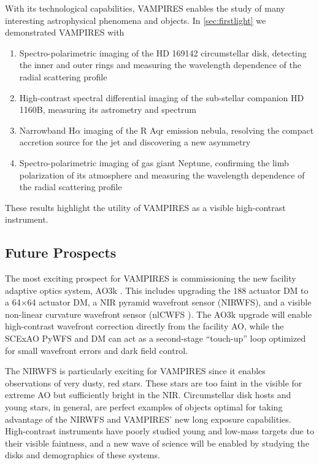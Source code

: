 With its technological capabilities, VAMPIRES enables the study of many interesting astrophysical phenomena and objects. In \autoref{sec:firstlight} we demonstrated VAMPIRES with 
\begin{enumerate}
\item Spectro-polarimetric imaging of the HD 169142 circumstellar disk, detecting the inner and outer rings and measuring the wavelength dependence of the radial scattering profile
\item High-contrast spectral differential imaging of the sub-stellar companion HD 1160B, measuring its astrometry and spectrum
\item Narrowband H$\alpha$ imaging of the R Aqr emission nebula, resolving the compact accretion source for the jet and discovering a new asymmetry
\item Spectro-polarimetric imaging of gas giant Neptune, confirming the limb polarization of its atmosphere and measuring the wavelength dependence of the radial scattering profile
\end{enumerate}
These results highlight the utility of VAMPIRES as a visible high-contrast instrument.

\subsection{Future Prospects}\label{sec:futureprospects}

The most exciting prospect for VAMPIRES is commissioning the new facility adaptive optics system, AO3k \citep{lozi_ao3000_2022}. This includes upgrading the 188 actuator DM to a 64$\times$64 actuator DM, a NIR pyramid wavefront sensor (NIRWFS), and a visible non-linear curvature wavefront sensor (nlCWFS \citealp{ahn_development_2023}). The AO3k upgrade will enable high-contrast wavefront correction directly from the facility AO,  while the SCExAO PyWFS and DM can act as a second-stage ``touch-up'' loop optimized for small wavefront errors and dark field control.

The NIRWFS is particularly exciting for VAMPIRES since it enables observations of very dusty, red stars. These stars are too faint in the visible for extreme AO but sufficiently bright in the NIR. Circumstellar disk hosts and young stars, in general, are perfect examples of objects optimal for taking advantage of the NIRWFS and VAMPIRES' new long exposure capabilities. High-contrast instruments have poorly studied young and low-mass targets due to their visible faintness, and a new wave of science will be enabled by studying the disks and demographics of these systems.

